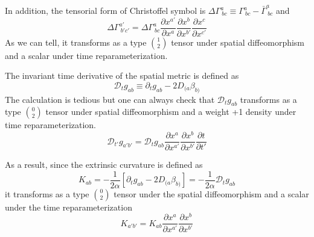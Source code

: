 \documentclass[letterpaper,nofootinbib,prd,amsmath,onecolumn]{revtex4-1}
\begin{document}
In addition, the tensorial form of Christoffel symbol is $\Delta \Gamma^{a}_{~bc} \equiv \Gamma^{a}_{~bc} - {\bar \Gamma}^{a}_{~bc}$ and
\begin{equation}
\Delta \Gamma^{a'}_{~b'c'} = \Delta \Gamma^{a}_{~bc}\frac{\partial x^{a'}}{\partial x^{a}}\frac{\partial x^{b}}{\partial x^{b'}}\frac{\partial x^{c}}{\partial x^{c'}}
\end{equation}
As we can tell, it transforms as a type $1 \choose 2$ tensor under spatial diffeomorphism and a scalar under time reparameterization. 

The invariant time derivative of the spatial metric is defined as
\begin{equation}
\mathscr{D}_{t}g_{ab} \equiv \partial_{t}g_{ab} - 2D_{(a}\beta_{b)}
\end{equation}
The calculation is tedious but one can always check that $\mathscr{D}_{t}g_{ab}$ transforms as a type $0 \choose 2$ tensor under spatial diffeomorphism and a weight +1 density under time reparameterization. 
\begin{equation}
\mathscr{D}_{t'}g_{a'b'} = \mathscr{D}_{t}g_{ab}\frac{\partial x^{a}}{\partial x^{a'}}\frac{\partial x^{b}}{\partial x^{b'}}\frac{\partial t}{\partial t'}
\end{equation}

As a result, since the extrinsic curvature is defined as
\begin{equation}
K_{ab} = -\frac{1}{2\alpha}[\partial_{t}g_{ab} - 2D_{(a}\beta_{b)}] = -\frac{1}{2\alpha}\mathscr{D}_{t}g_{ab}
\end{equation}
it transforms as a type $0 \choose 2$ tensor under the spatial diffeomorphism and a scalar under the time reparameterization
\begin{equation}
K_{a'b'} = K_{ab}\frac{\partial x^{a}}{\partial x^{a'}}\frac{\partial x^{b}}{\partial x^{b'}}
\end{equation}
\end{document}

